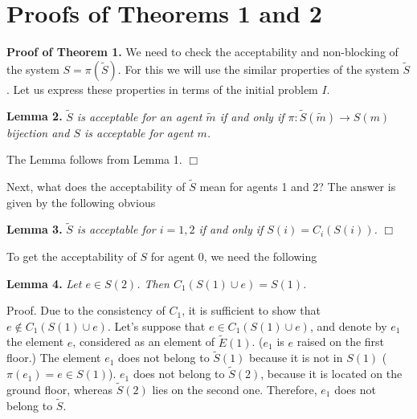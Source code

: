 \documentclass[12pt,a4paper]{article}
\begin{document}
\section{Proofs of Theorems 1 and 2}


\textbf{Proof of Theorem 1.} We need to check the acceptability and non-blocking of the system $S=\pi(\widetilde{S})$. For this we will use the similar properties of the system $\widetilde S$. Let us express these properties in terms of the initial problem $I$.\medskip

\textbf{Lemma 2.} \emph{$\widetilde S$ is acceptable for an agent $\widetilde m$ if and only if $\pi :\widetilde S(\widetilde m) \to S(m)$ bijection and $S$ is acceptable for agent $m$.}\medskip

The Lemma follows from Lemma 1. $\Box$\medskip

Next, what does the acceptability of $\widetilde S$ mean for agents 1 and 2? The answer is given by the following obvious\medskip

\textbf{Lemma 3.} \emph{$\widetilde S$ is acceptable for $i=1,2$ if and only if       $S(i)=C_i(S(i))$. } $\Box$\medskip

To get the acceptability of $S$ for agent 0, we need the following\medskip


\textbf{Lemma 4.} \emph{Let $e\in S(2)$. Then $C_1(S(1)\cup e)=S(1)$.} \medskip

Proof. Due to the consistency of $C_1$, it is sufficient to show that $e \notin C_1(S(1)\cup e)$. Let's suppose that $e\in C_1(S(1)\cup e)$, and denote       by $e_1$ the element $e$, considered as an element of $\widetilde E(1)$. ($e_1$ is $e$ raised on the first floor.) The element $e_1$ does not belong to $\widetilde S(1)$ because it is not in $S(1)$ ($\pi (e_1)=e\in S(1)$). $e_1$ does not belong to $\widetilde S(2)$, because it is located on the ground floor, whereas $\widetilde S(2)$ lies on the second one. Therefore, $e_1$ does not belong to $\widetilde S$.
\end{document}
